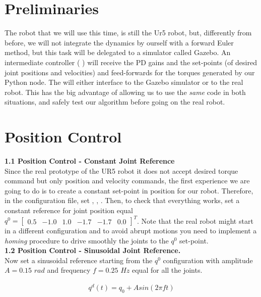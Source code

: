 \documentclass[11pt]{article}
\newcommand{\mat}[1]{\ensuremath{\begin{bmatrix}#1\end{bmatrix}}}	%
\begin{document}
\section{Preliminaries}
	The robot that we will use this time, is still the  Ur5 robot, but, differently from before, we will not integrate the dynamics by ourself with a forward Euler method,  but this task will be delegated to a simulator called Gazebo. An intermediate controller ( ) will receive the PD gains and the set-points (of desired joint positions and velocities) and feed-forwards for the torques generated by our Python node.
	The   will either interface to the  Gazebo simulator or to the real robot. This has the big advantage of  allowing us to use the \textit{same} code in both situations, and safely test our algorithm before going on the real robot.\\

\section{Position Control}

\textbf{1.1 Position Control - Constant Joint Reference}\\
Since the real prototype of the UR5 robot it does not accept desired torque command but only position and velocity commands, 
the first experience we are going to do is to create a constant set-point in position for our robot. 
Therefore, in the  configuration file, set ,   
, .
Then, to check that everything works, set a constant reference for joint position equal $q^0=\mat{ 0.5& -1.0& 1.0& -1.7& -1.7& 0.0}^T$.
Note that the real robot might start in a different configuration and to avoid abrupt motions you need to implement a \textit{homing} procedure to drive smoothly the joints to  the  $q^0$ set-point. \\

\textbf{1.2 Position Control - Sinusoidal  Joint Reference.}\\
Now set a sinusoidal reference starting from the  $q^0$ configuration with amplitude $A= 0.15$ $rad$ and frequency $f = 0.25$ $Hz$ equal for all the joints.

\begin{align*}
q^d(t) = q_0 + Asin(2\pi f t )
\end{align*} 
\end{document}
